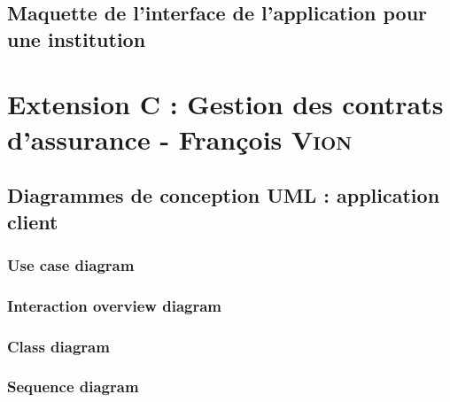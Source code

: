 \documentclass[]{report}
\begin{document}


\newpage

\section{Maquette de l'interface de l'application pour une institution}







\chapter{Extension C : Gestion des contrats d’assurance - François \textsc{Vion}}



\newpage



\section{Diagrammes de conception UML : application client}



\subsection{Use case diagram}



\newpage

\subsection{Interaction overview diagram}



\newpage

\subsection{Class diagram}



\newpage

\subsection{Sequence diagram}
\end{document}
